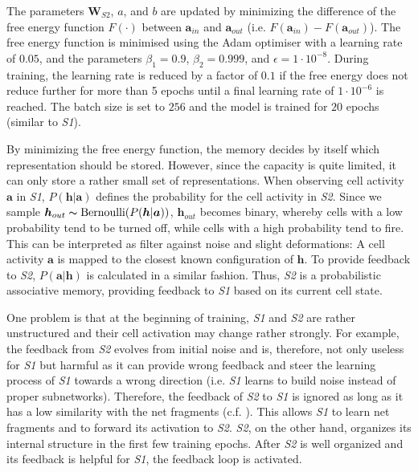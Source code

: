 The parameters $\boldsymbol{W}_{S2}$, $a$, and $b$ are updated by minimizing the difference of the free energy function $F(\cdot)$  between $\boldsymbol{a}_{in}$ and $\boldsymbol{a}_{out}$ (i.e. $F(\boldsymbol{a}_{in}) - F(\boldsymbol{a}_{out})$).
The free energy function is minimised using the Adam  optimiser with a learning rate of $0.05$, and the parameters $\beta_1=0.9$, $\beta_2=0.999$, and $\epsilon=1\cdot10^{-8}$.
During training, the learning rate is reduced by a factor of $0.1$ if the free energy does not reduce further for more than 5 epochs until a final learning rate of $1\cdot10^{-6}$ is reached.
The batch size is set to $256$ and the model is trained for $20$ epochs (similar to \emph{S1}).



By minimizing the free energy function, the memory decides by itself which representation should be stored.
However, since the capacity is quite limited, it can only store a rather small set of representations.
When observing cell activity $\boldsymbol{a}$ in \emph{S1}, $P(\boldsymbol{h}|\boldsymbol{a})$ defines the probability for the cell activity in \emph{S2}. Since we sample $\boldsymbol{h}_{out} \thicksim \text{Bernoulli}(P(\boldsymbol{h} | \boldsymbol{a}) )$, $\boldsymbol{h}_{out}$ becomes binary, whereby cells with a low probability tend to be turned off, while cells with a high probability tend to fire.
This can be interpreted as filter against noise and slight deformations: A cell activity $\boldsymbol{a}$ is mapped to the closest known configuration of $\boldsymbol{h}$.
To provide feedback to \emph{S2}, $P(\boldsymbol{a}|\boldsymbol{h})$ is calculated in a similar fashion. Thus, \emph{S2} is a probabilistic associative memory, providing feedback to \emph{S1} based on its current cell state.

One problem is that at the beginning of training, \emph{S1} and \emph{S2} are rather unstructured and their cell activation may change rather strongly.
For example, the feedback from \emph{S2} evolves from initial noise and is, therefore, not only useless for \emph{S1} but harmful as it can provide wrong feedback and steer the learning process of \emph{S1} towards a wrong direction (i.e. \emph{S1} learns to build noise instead of proper subnetworks).
Therefore, the feedback of \emph{S2} to \emph{S1} is ignored as long as it has a low similarity with the net fragments (c.f. \secref{}).
This allows \emph{S1} to learn net fragments and to forward its activation to \emph{S2}. \emph{S2}, on the other hand, organizes its internal structure in the first few training epochs.
After \emph{S2} is well organized and its feedback is helpful for \emph{S1}, the feedback loop is activated.













